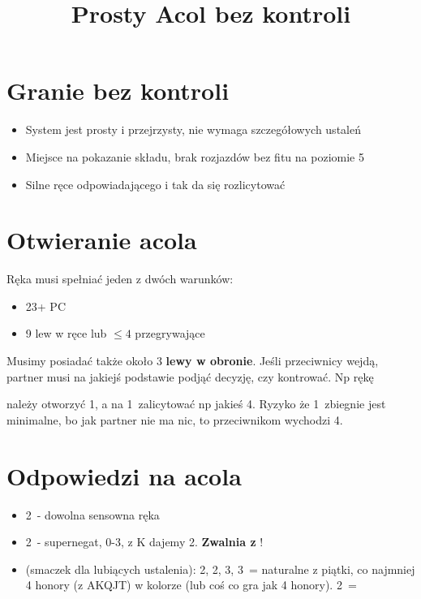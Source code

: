 \documentclass[12pt, a4paper]{article}
\author{}
\date{}
\title{Prosty Acol bez kontroli}
\begin{document}
\maketitle
\section{Granie bez kontroli}
\begin{itemize}
    \item System jest prosty i przejrzysty, nie wymaga szczegółowych ustaleń
    \item Miejsce na pokazanie składu, brak rozjazdów bez fitu na poziomie 5
    \item Silne ręce odpowiadającego i tak da się rozlicytować
\end{itemize}

\section{Otwieranie acola}
Ręka musi spełniać jeden z dwóch warunków:
\begin{itemize}
    \item 23+ PC
    \item 9 lew w ręce lub $\leq 4$ przegrywające
\end{itemize}

Musimy posiadać także około 3 \textbf{lewy w obronie}. Jeśli przeciwnicy wejdą, partner musi 
na jakiejś podstawie podjąć decyzję, czy kontrować. Np rękę
\begin{center}
\end{center}
należy otworzyć 1\spades, a na 1\nt\ zalicytować np jakieś 4\hearts. Ryzyko że 1\spades\ zbiegnie jest minimalne,
bo jak partner nie ma nic, to przeciwnikom wychodzi 4\hearts.

\section{Odpowiedzi na acola}
\begin{itemize}
    \item 2\diams\ - dowolna sensowna ręka
    \item 2\hearts\ - supernegat, 0-3\hcp, z K dajemy 2\diams. \textbf{Zwalnia z \gf}!
    \item (smaczek dla lubiących ustalenia): 2\spades, 2\nt, 3\clubs, 3\diams\ = naturalne z piątki,
    co najmniej 4 honory (z AKQJT) w kolorze (lub coś co gra jak 4 honory). 2\nt\ = \hearts
\end{itemize}
\end{document}
